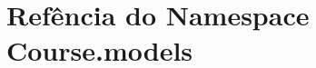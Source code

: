 \hypertarget{namespaceCourse_1_1models}{\section{Refência do Namespace Course.\-models}
\label{namespaceCourse_1_1models}
}
